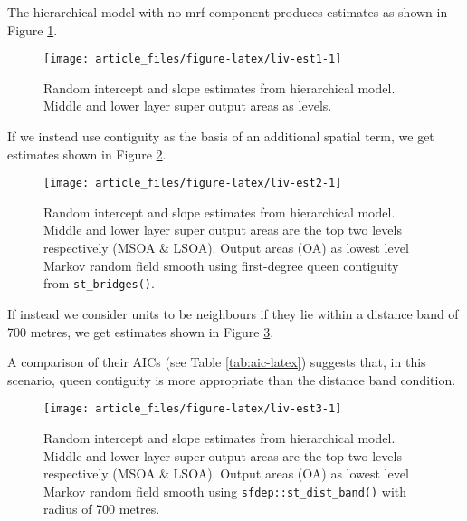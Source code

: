 The hierarchical model with no mrf component produces estimates as shown
in Figure \ref{fig:liv-est1}.

\begin{figure}

{\centering \texttt{[image: article\_files/figure-latex/liv-est1-1]} 

}

\caption{Random intercept and slope estimates from hierarchical model. Middle and lower layer super output areas as levels. }\label{fig:liv-est1}
\end{figure}

If we instead use contiguity as the basis of an additional spatial term,
we get estimates shown in Figure \ref{fig:liv-est2}.



\begin{figure}

{\centering \texttt{[image: article\_files/figure-latex/liv-est2-1]} 

}

\caption{Random intercept and slope estimates from hierarchical model. Middle and lower layer super output areas are the top two levels respectively (MSOA \& LSOA). Output areas (OA) as lowest level Markov random field smooth using first-degree queen contiguity from \texttt{st\_bridges()}.}\label{fig:liv-est2}
\end{figure}

If instead we consider units to be neighbours if they lie within a
distance band of 700 metres, we get estimates shown in Figure
\ref{fig:liv-est3}.

A comparison of their AICs (see Table \ref{tab:aic-latex}) suggests that, in this scenario, queen contiguity is more appropriate than the distance band condition.



\begin{figure}

{\centering \texttt{[image: article\_files/figure-latex/liv-est3-1]} 

}

\caption{Random intercept and slope estimates from hierarchical model. Middle and lower layer super output areas are the top two levels respectively (MSOA \& LSOA). Output areas (OA) as lowest level Markov random field smooth using \texttt{sfdep::st\_dist\_band()} with radius of 700 metres.}\label{fig:liv-est3}
\end{figure}

